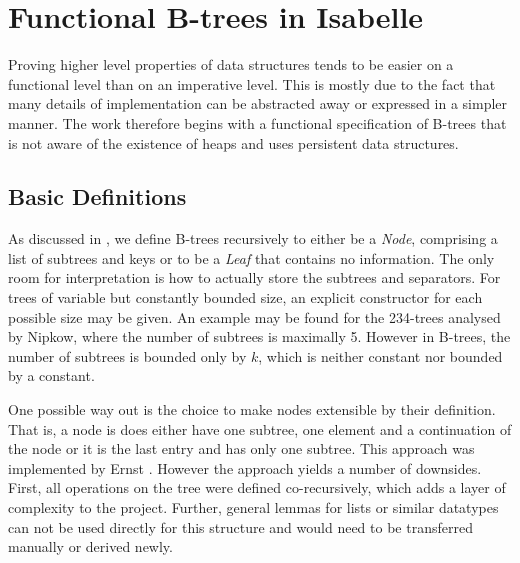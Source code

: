 

\chapter{Functional B-trees in Isabelle}\label{chapter:abs-set}

Proving higher level properties of data structures
tends to be easier on a functional level than on an imperative
level.
This is mostly due to the fact that many details of implementation
can be abstracted away or expressed in a simpler manner.
The work therefore begins with a functional specification of B-trees
that is not aware of the existence of heaps and uses
persistent data structures.

\section{Basic Definitions}
\label{sec:basic-defs}


As discussed in ,
we define B-trees recursively to either
be a \textit{Node}, comprising a list
of subtrees and keys or to be a \textit{Leaf}
that contains no information.
The only room for interpretation is how to actually
store the subtrees and separators.
For trees of variable but constantly bounded size,
an explicit constructor for each possible size may be given.
An example may be found for the 234-trees analysed by Nipkow\parencite{DBLP:conf/itp/Nipkow16},
where the number of subtrees is maximally 5.
However in B-trees, the number of subtrees
is bounded only by $k$, which is neither constant
nor bounded by a constant.

One possible way out is the choice to make nodes
extensible by their definition.
That is, a node is does either have one subtree,
one element and a continuation of the node or
it is the last entry and has only one subtree.
This approach was implemented by Ernst \parencite{DBLP:journals/sosym/ErnstSR15}.
However the approach yields a number of downsides.
First, all operations on the tree were defined co-recursively,
which adds a layer of complexity to the project.
Further, general lemmas for lists or similar datatypes can not
be used directly for this structure and would need to be transferred manually
or derived newly.

